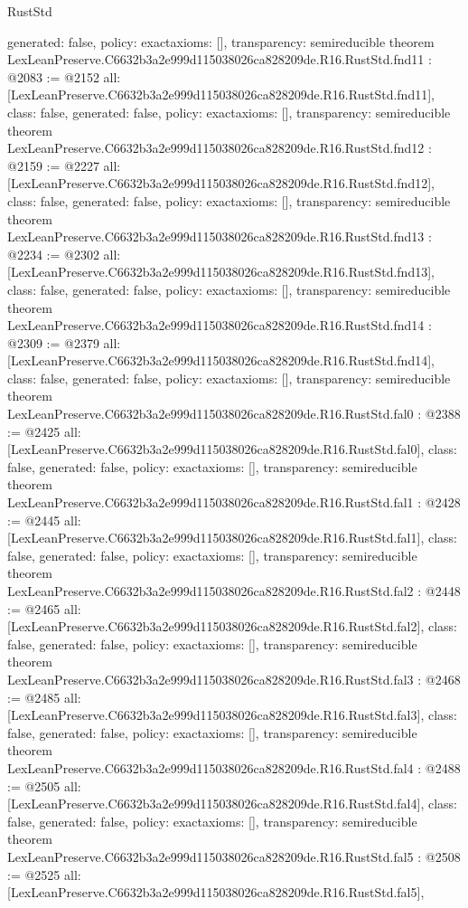 \begin{lexlean}{RustStd}
\begin{coremodule}
{  generated: false,
  policy: exact{axioms: []},
  transparency: semireducible
}
theorem LexLeanPreserve.C6632b3a2e999d115038026ca828209de.R16.RustStd.fnd11 : @2083 := @2152 {
  all: [LexLeanPreserve.C6632b3a2e999d115038026ca828209de.R16.RustStd.fnd11],
  class: false,
  generated: false,
  policy: exact{axioms: []},
  transparency: semireducible
}
theorem LexLeanPreserve.C6632b3a2e999d115038026ca828209de.R16.RustStd.fnd12 : @2159 := @2227 {
  all: [LexLeanPreserve.C6632b3a2e999d115038026ca828209de.R16.RustStd.fnd12],
  class: false,
  generated: false,
  policy: exact{axioms: []},
  transparency: semireducible
}
theorem LexLeanPreserve.C6632b3a2e999d115038026ca828209de.R16.RustStd.fnd13 : @2234 := @2302 {
  all: [LexLeanPreserve.C6632b3a2e999d115038026ca828209de.R16.RustStd.fnd13],
  class: false,
  generated: false,
  policy: exact{axioms: []},
  transparency: semireducible
}
theorem LexLeanPreserve.C6632b3a2e999d115038026ca828209de.R16.RustStd.fnd14 : @2309 := @2379 {
  all: [LexLeanPreserve.C6632b3a2e999d115038026ca828209de.R16.RustStd.fnd14],
  class: false,
  generated: false,
  policy: exact{axioms: []},
  transparency: semireducible
}
theorem LexLeanPreserve.C6632b3a2e999d115038026ca828209de.R16.RustStd.fal0 : @2388 := @2425 {
  all: [LexLeanPreserve.C6632b3a2e999d115038026ca828209de.R16.RustStd.fal0],
  class: false,
  generated: false,
  policy: exact{axioms: []},
  transparency: semireducible
}
theorem LexLeanPreserve.C6632b3a2e999d115038026ca828209de.R16.RustStd.fal1 : @2428 := @2445 {
  all: [LexLeanPreserve.C6632b3a2e999d115038026ca828209de.R16.RustStd.fal1],
  class: false,
  generated: false,
  policy: exact{axioms: []},
  transparency: semireducible
}
theorem LexLeanPreserve.C6632b3a2e999d115038026ca828209de.R16.RustStd.fal2 : @2448 := @2465 {
  all: [LexLeanPreserve.C6632b3a2e999d115038026ca828209de.R16.RustStd.fal2],
  class: false,
  generated: false,
  policy: exact{axioms: []},
  transparency: semireducible
}
theorem LexLeanPreserve.C6632b3a2e999d115038026ca828209de.R16.RustStd.fal3 : @2468 := @2485 {
  all: [LexLeanPreserve.C6632b3a2e999d115038026ca828209de.R16.RustStd.fal3],
  class: false,
  generated: false,
  policy: exact{axioms: []},
  transparency: semireducible
}
theorem LexLeanPreserve.C6632b3a2e999d115038026ca828209de.R16.RustStd.fal4 : @2488 := @2505 {
  all: [LexLeanPreserve.C6632b3a2e999d115038026ca828209de.R16.RustStd.fal4],
  class: false,
  generated: false,
  policy: exact{axioms: []},
  transparency: semireducible
}
theorem LexLeanPreserve.C6632b3a2e999d115038026ca828209de.R16.RustStd.fal5 : @2508 := @2525 {
  all: [LexLeanPreserve.C6632b3a2e999d115038026ca828209de.R16.RustStd.fal5],
}
\end{coremodule}
\end{lexlean}
